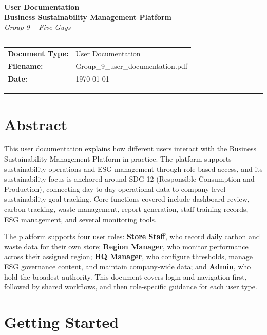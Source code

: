 \documentclass[11pt,a4paper]{article}
\newcommand{\rolelabel}[1]{\textbf{#1}}
\begin{document}
\begin{center}
{\Large \textbf{User Documentation}}\\
\vspace{0.25em}
{\large \textbf{Business Sustainability Management Platform}}\\
\vspace{0.35em}
{\small\itshape Group 9 -- Five Guys}
\end{center}

\vspace{0.25em}
\hrule
\vspace{0.25em}
{\small
\begin{tabular}{@{}ll}
\textbf{Document Type:} & User Documentation \\
\textbf{Filename:}       & Group\_9\_user\_documentation.pdf \\
\textbf{Date:}          & \today \\
\end{tabular}
}
\vspace{0.2em}
\hrule
\vspace{0.4em}
\thispagestyle{plain}
\normalsize

\section*{Abstract}
This user documentation explains how different users interact with the Business Sustainability Management Platform in practice. The platform supports sustainability operations and ESG management through role-based access, and its sustainability focus is anchored around SDG 12 (Responsible Consumption and Production), connecting day-to-day operational data to company-level sustainability goal tracking. Core functions covered include dashboard review, carbon tracking, waste management, report generation, staff training records, ESG management, and several monitoring tools.

The platform supports four user roles: \rolelabel{Store Staff}, who record daily carbon and waste data for their own store; \rolelabel{Region Manager}, who monitor performance across their assigned region; \rolelabel{HQ Manager}, who configure thresholds, manage ESG governance content, and maintain company-wide data; and \rolelabel{Admin}, who hold the broadest authority. This document covers login and navigation first, followed by shared workflows, and then role-specific guidance for each user type.


\section{Getting Started}
\end{document}
